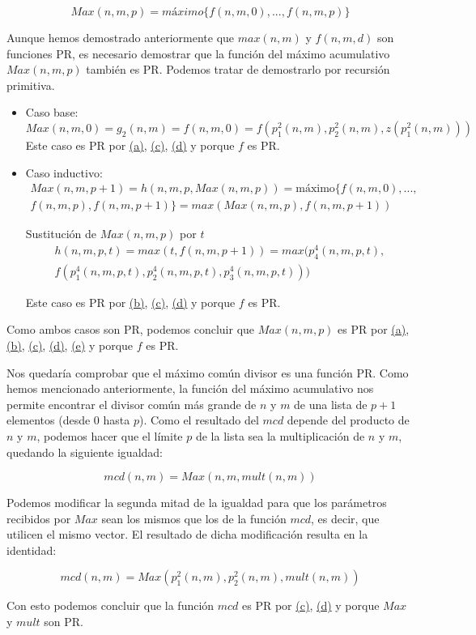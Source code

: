 \documentclass[a4paper,12pt]{article}
\begin{document}
$$Max(n,m,p)= máximo\{f(n,m,0), ..., f(n,m,p)\}$$

Aunque hemos demostrado anteriormente que $max(n,m)$ y $f(n,m,d)$ son funciones PR, es necesario demostrar que la función del máximo acumulativo $Max(n,m,p)$ también es PR. Podemos tratar de demostrarlo por recursión primitiva.

\begin{itemize}
    \item Caso base:
    $$Max(n,m,0)= g_{2}(n,m)=f(n,m,0)= f(p^{2}_{1}(n,m), p^{2}_{2}(n,m), z(p^{2}_{1}(n,m)))$$ 
    Este caso es PR por \hyperlink{func_a}{(a)}, \hyperlink{func_c}{(c)}, \hyperlink{func_d}{(d)} y porque $f$ es PR.
    
    \item Caso inductivo:
    \begin{multline*}
        Max(n,m,p+1)=h(n,m,p,Max(n,m,p)) = \text{máximo}\{f(n,m,0), ..., \\ f(n,m,p), f(n,m,p+1)\} = max(Max(n,m,p),f(n,m,p+1))
    \end{multline*}

    Sustitución de $Max(n,m,p)$ por $t$
    \begin{multline*}
        h(n,m,p,t) = max(t,f(n,m,p+1)) = max(p^{4}_{4}(n,m,p,t), \\ f(p^{4}_{1}(n,m,p,t), p^{4}_{2}(n,m,p,t), p^{4}_{3}(n,m,p,t)))
    \end{multline*}

    Este caso es PR por \hyperlink{func_b}{(b)}, \hyperlink{func_c}{(c)}, \hyperlink{func_d}{(d)} y porque $f$ es PR.
\end{itemize}

Como ambos casos son PR, podemos concluir que $Max(n,m,p)$ es PR por \hyperlink{func_a}{(a)}, \hyperlink{func_b}{(b)}, \hyperlink{func_c}{(c)}, \hyperlink{func_d}{(d)}, \hyperlink{func_e}{(e)} y porque $f$ es PR.

Nos quedaría comprobar que el máximo común divisor es una función PR. Como hemos mencionado anteriormente, la función del máximo acumulativo nos permite encontrar el divisor común más grande de $n$ y $m$ de una lista de $p+1$ elementos (desde 0 hasta $p$). Como el resultado del $mcd$ depende del producto de $n$ y $m$, podemos hacer que el límite $p$ de la lista sea la multiplicación de $n$ y $m$, quedando la siguiente igualdad:

$$mcd(n,m) = Max(n,m,mult(n,m))$$

Podemos modificar la segunda mitad de la igualdad para que los parámetros recibidos por $Max$ sean los mismos que los de la función $mcd$, es decir, que utilicen el mismo vector. El resultado de dicha modificación resulta en la identidad:

$$mcd(n,m) = Max(p^{2}_{1}(n,m),p^{2}_{2}(n,m),mult(n,m))$$

Con esto podemos concluir que la función $mcd$ es PR por \hyperlink{func_c}{(c)}, \hyperlink{func_d}{(d)} y porque $Max$ y $mult$ son PR.
\end{document}
